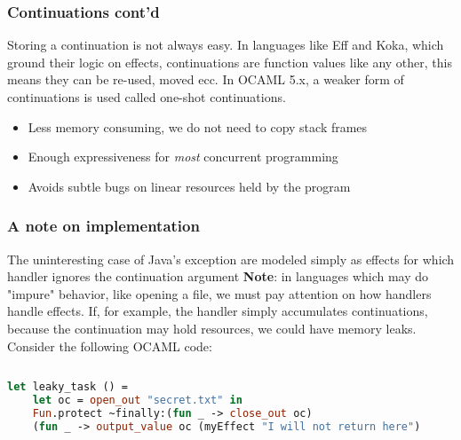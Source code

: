 \documentclass[t]{beamer}
\begin{document}
\begin{frame}[fragile]
	\frametitle{Continuations cont'd}	
	Storing a continuation is not \alert{always} easy.
	\newline
	\newline
	In languages like Eff and Koka, which ground their logic on effects, continuations are function values like any other, this means they can be re-used, moved ecc.
	\newline
	\newline
	In OCAML 5.x, a weaker form of continuations is used called \alert{one-shot continuations}.
	\newline
	\begin{itemize}
		\item Less memory consuming, we do not need to copy stack frames
		\item Enough expressiveness for \textit{most} concurrent programming
		\item Avoids subtle bugs on linear resources held by the program
	\end{itemize}
\end{frame}

\begin{frame}[fragile]
	\frametitle{A note on implementation}
	The uninteresting case of Java's exception are modeled simply as effects for which handler ignores the continuation argument
	\newline
	\newline
	\textbf{Note}: in languages which may do "impure" behavior, like opening a file, we must pay attention on how handlers handle effects. 
	If, for example, the handler simply accumulates continuations, because the continuation may hold resources, we could have memory leaks. 
	\newline
	Consider the following OCAML code:
	\begin{lstlisting}[language=ocaml, basicstyle=\scriptsize\ttfamily, breaklines=true, xleftmargin=0em, lineskip=-1pt, aboveskip=0pt, belowskip=0pt, moredelim={[is][\color{red}]{STARTRC}{ENDRC}}]
		
let leaky_task () =
	let oc = open_out "secret.txt" in
	Fun.protect ~finally:(fun _ -> close_out oc) 
	(fun _ -> output_value oc (myEffect "I will not return here")
	\end{lstlisting}
	
\end{frame}
\end{document}
